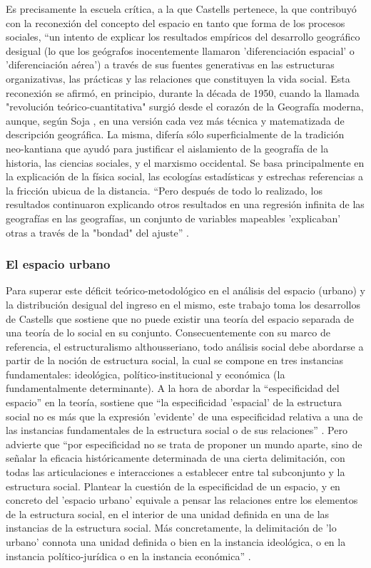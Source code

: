 	Es precisamente la escuela crítica, a la que Castells pertenece, la que contribuyó con la reconexión del concepto del espacio en tanto que forma de los procesos sociales, “un intento de explicar los resultados empíricos del desarrollo geográfico desigual (lo que los geógrafos inocentemente llamaron 'diferenciación espacial' o 'diferenciación aérea') a través de sus fuentes generativas en las estructuras organizativas, las prácticas y las relaciones que constituyen la vida social. Esta reconexión se afirmó, en principio, durante la década de 1950, cuando la llamada "revolución teórico-cuantitativa" surgió desde el corazón de la Geografía moderna, aunque, según Soja \citeyear{soja}, en una versión cada vez más técnica y matematizada de descripción geográfica. La misma, difería sólo superficialmente de la tradición neo-kantiana que ayudó para justificar el aislamiento de la geografía de la historia, las ciencias sociales, y el marxismo occidental. Se basa principalmente en la explicación de la física social, las ecologías estadísticas y estrechas referencias a la fricción ubicua de la distancia. “Pero después de todo lo realizado, los resultados continuaron explicando otros resultados en una regresión infinita de las geografías en las geografías, un conjunto de variables mapeables 'explicaban' otras a través de la "bondad" del ajuste” \cite[p.~51]{soja}.
	
	\subsubsection{El espacio urbano}
	
	Para superar este déficit teórico-metodológico en el análisis del espacio (urbano) y la distribución desigual del ingreso en el mismo, este trabajo toma los desarrollos de Castells que sostiene que no puede existir una teoría del espacio separada de una teoría de lo social en su conjunto. Consecuentemente con su marco de referencia, el estructuralismo althousseriano, todo análisis social debe abordarse a partir de la noción de estructura social, la cual se compone en tres instancias fundamentales: ideológica, político-institucional y económica (la fundamentalmente determinante). A la hora de abordar la “especificidad del espacio” en la teoría, sostiene que “la especificidad 'espacial' de la estructura social no es más que la expresión 'evidente' de una especificidad relativa a una de las instancias fundamentales de la estructura social o de sus relaciones” \cite[p.~277]{castells}. Pero advierte que “por especificidad no se trata de proponer un mundo aparte, sino de señalar la eficacia históricamente determinada de una cierta delimitación, con todas las articulaciones e interacciones a establecer entre tal subconjunto y la estructura social. Plantear la cuestión de la especificidad de un espacio, y en concreto del 'espacio urbano' equivale a pensar las relaciones entre los elementos de la estructura social, en el interior de una unidad definida en una de las instancias de la estructura social. Más concretamente, la delimitación de 'lo urbano' connota una unidad definida o bien en la instancia ideológica, o en la instancia político-jurídica o en la instancia económica” \cite[p.~277]{castells}.
	
